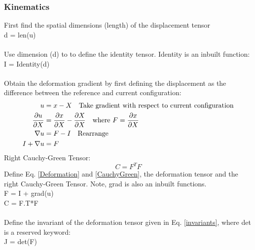 \documentclass[12pt,3p]{article}
\begin{document}
\subsubsection{Kinematics}
First find the spatial dimensions (length) of the displacement tensor \\
{\selectfont
d = len(u)          \\ \\
}
Use dimension (d) to to define the identity tensor. {\selectfont Identity} is an inbuilt function: \\
{\selectfont
I = Identity(d)     \\ \\ 
}
Obtain the deformation gradient by first defining the displacement as the difference between the reference and current configuration: 
\begin{align}\label{Deformation}
\begin{split}
u &= x - X \quad \text{Take gradient with respect to current configuration} \\
\pdv{u}{X} &= \pdv{x}{X} - \pdv{X}{X} \quad \text{where } F = \pdv{x}{X} \\
\nabla u &= F - I \quad \text{Rearrange}\\
I + \nabla u &= F
\end{split}
\end{align}
Right Cauchy-Green Tensor:
\begin{equation}\label{CauchyGreen}
C = F^T F
\end{equation}
Define Eq. \ref{Deformation} and \ref{CauchyGreen}, the deformation tensor and the right Cauchy-Green Tensor. Note, {\selectfont grad} is also an inbuilt functions. \\
{\selectfont
F = I + grad(u)    \\
C = F.T*F \\ \\
}
Define the invariant of the deformation tensor given in Eq. \ref{invariants}, where {\selectfont det } is a reserved keyword:  \\
{\selectfont
J  = det(F) 
}
\end{document}
